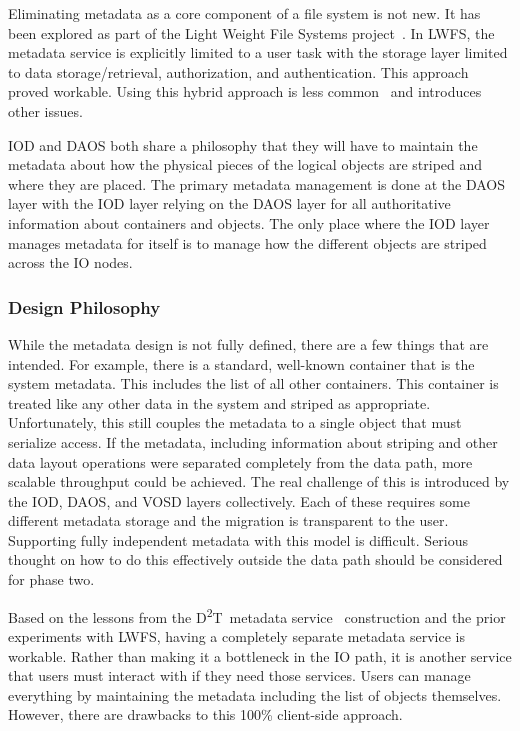 \documentclass[conference]{IEEEtran}
\newcommand{\DDT}{D\textsuperscript{2}T~}
\begin{document}
Eliminating metadata as a core component of a file system is not new. It has
been explored as part of the Light Weight File Systems
project~\cite{oldfield:lwfs}. In LWFS, the metadata service is explicitly
limited to a user task with the storage layer limited to data
storage/retrieval, authorization, and authentication. This approach proved
workable. Using this hybrid approach is less common~\cite{weil:2006:ceph} and
introduces other issues.

IOD and DAOS both share a philosophy that they will have to maintain the
metadata about how the physical pieces of the logical objects are striped and
where they are placed. The primary metadata management is done at the DAOS
layer with the IOD layer relying on the DAOS layer for all authoritative
information about containers and objects. The only place where the IOD layer
manages metadata for itself is to manage how the different objects are striped
across the IO nodes.

\subsubsection{Design Philosophy}
While the metadata design is not fully defined, there are a few things that
are intended. For example, there is a standard, well-known container that is
the system metadata. This includes the list of all other containers. This
container is treated like any other data in the system and striped as
appropriate. Unfortunately, this still couples the metadata to a single object
that must serialize access. If the metadata, including information about
striping and other data layout operations were separated completely from the
data path, more scalable throughput could be achieved. The real challenge of
this is introduced by the IOD, DAOS, and VOSD layers collectively. Each of
these requires some different metadata storage and the migration is transparent
to the user.  Supporting fully independent metadata with this model is
difficult. Serious thought on how to do this effectively outside the data path
should be considered for phase two.

Based on the lessons from the \DDT metadata
service~\cite{lofstead:2012:txn-metadata} construction and the prior
experiments with LWFS, having a completely separate metadata service is
workable. Rather than making it a bottleneck in the IO path, it is another
service that users must interact with if they need those services.  Users can
manage everything by maintaining the metadata including the list of objects
themselves. However, there are drawbacks to this 100\% client-side approach.
\end{document}
